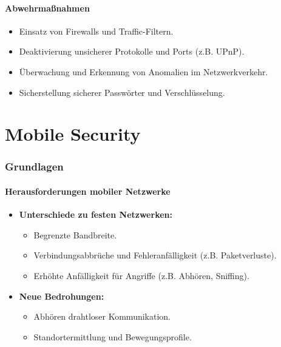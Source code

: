 \documentclass{article}
\begin{document}
\subsection{Abwehrmaßnahmen}
\begin{itemize}
    \item Einsatz von Firewalls und Traffic-Filtern.
    \item Deaktivierung unsicherer Protokolle und Ports (z.B. UPnP).
    \item Überwachung und Erkennung von Anomalien im Netzwerkverkehr.
    \item Sicherstellung sicherer Passwörter und Verschlüsselung.
\end{itemize}





\part{Mobile Security}
\section{Grundlagen}

\subsection{Herausforderungen mobiler Netzwerke}
\begin{itemize}
    \item \textbf{Unterschiede zu festen Netzwerken:}
    \begin{itemize}
        \item Begrenzte Bandbreite.
        \item Verbindungsabbrüche und Fehleranfälligkeit (z.B. Paketverluste).
        \item Erhöhte Anfälligkeit für Angriffe (z.B. Abhören, Sniffing).
    \end{itemize}
    \item \textbf{Neue Bedrohungen:}
    \begin{itemize}
        \item Abhören drahtloser Kommunikation.
        \item Standortermittlung und Bewegungsprofile.
    \end{itemize}
\end{itemize}
\end{document}
